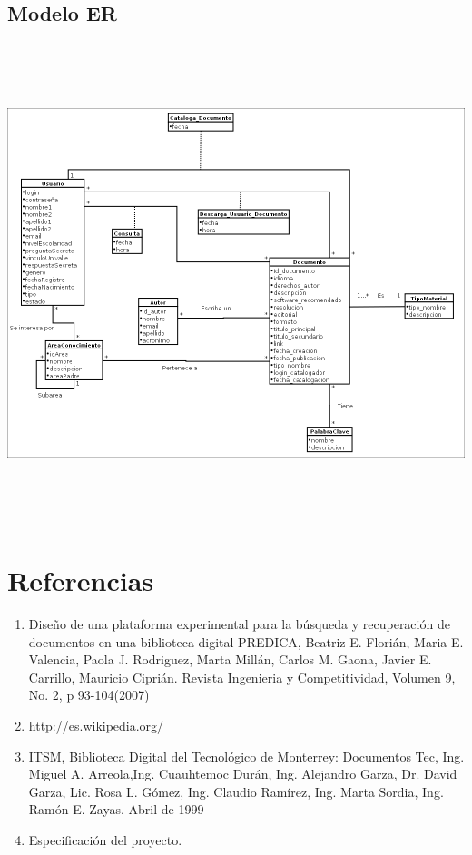 \documentclass[11pt]{article}
\begin{document}
		
		\subsection{Modelo ER} 
			\begin{minipage}[c]{1\linewidth}
                \centering
                \includegraphics[width=16cm, height=14cm]{ModeloDatos}
        	\end{minipage}
                        
\section{Referencias}
        \begin{enumerate}
                \item Diseño de una plataforma experimental para la búsqueda y recuperación de
                documentos en una biblioteca digital PREDICA, Beatriz E. Florián, Maria E.
                Valencia, Paola J. Rodriguez, Marta Millán, Carlos M. Gaona, Javier E. Carrillo,
                Mauricio Ciprián. Revista Ingenieria y Competitividad, Volumen 9, No. 2, p
                93-104(2007)
                
                \item http://es.wikipedia.org/
                
                \item ITSM, Biblioteca Digital del Tecnológico de Monterrey: Documentos Tec,
                Ing. Miguel A. Arreola,Ing. Cuauhtemoc Durán, Ing. Alejandro Garza,
                Dr. David Garza, Lic. Rosa L. Gómez, Ing. Claudio Ramírez, Ing. Marta Sordia,
                Ing. Ramón E. Zayas. Abril de 1999                
                
                \item Especificación del proyecto.
        \end{enumerate}                
                        
\end{document}
